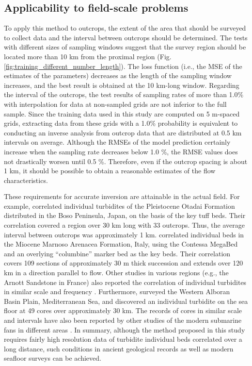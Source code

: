 \subsection{Applicability to field-scale problems}
To apply this method to outcrops, the extent of the area that should be surveyed to collect data and the interval between outcrops should be determined. The tests with different sizes of sampling windows suggest that the survey region should be located more than 10 km from the proximal region (Fig. \ref{fig:training_different_number_length}). The loss function (i.e., the MSE of the estimates of the parameters) decreases as the length of the sampling window increases, and the best result is obtained at the 10 km-long window. Regarding the interval of the outcrops, the test results of sampling rates of more than 1.0\% with interpolation for data at non-sampled grids are not inferior to the full sample. Since the training data used in this study are computed on 5 m-spaced grids, extracting data from these grids with a 1.0\% probability is equivalent to conducting an inverse analysis from outcrop data that are distributed at 0.5 km intervals on average. Although the RMSEs of the model prediction certainly increase when the sampling rate decreases below 1.0 \%, the RMSE values does not drastically worsen until 0.5 \%. Therefore, even if the outcrop spacing is about 1 km, it should be possible to obtain a reasonable estimates of the flow characteristics.

These requirements for accurate inversion are attainable in the actual field. For example, \citet{Hirayama1977} correlated individual turbidites of the Pleistocene Otadai Formation distributed in the Boso Peninsula, Japan, on the basis of the key tuff beds. Their correlation covered a region over 30 km long with 33 outcrops. Thus, the average interval between outcrops was approximately 1 km. \citet{Amy2006} correlated individual beds in the Miocene Marnoso Arenacea Formation, Italy, using the Contessa MegaBed and an overlying ``columbine'' marker bed as the key beds. Their correlation covers 109 sections of approximately 30 m thick succession and extends over 120 km in a direction parallel to flow. Other studies in various regions (e.g., the Arnott Sandstone in France) also reported the correlation of individual turbidites in similar scale and frequency \citep{HESSE1974,Tokuhashi1979,Tokuhashi1989,Amy2000,Amy2004}. Furthermore, \citet{Bartolini1972} surveyed the Western Alboran Basin Plain, Mediterranean Sea, and discovered an individual turbidite on the sea floor at 49 cores over approximately 30 km. The records of cores in similar scale and intervals have also been reported by other studies of the modern submarine fans in different areas \citep{BORNHOLD1971, Pilkey1980}. In summary, although the method proposed in this study requires fairly high resolution data of turbidite individual beds correlated over a long distance, such conditions in ancient geological records as well as modern seafloor surveys can be achieved.

